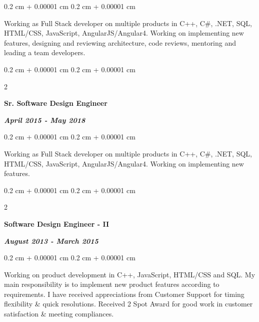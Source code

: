 \documentclass[10pt, letterpaper]{article}
\newenvironment{highlights}{
    \begin{itemize}[
        topsep=0.10 cm,
        parsep=0.10 cm,
        partopsep=0pt,
        itemsep=0pt,
        leftmargin=0.4 cm + 10pt
    ]
}{
    \end{itemize}
} %
\newenvironment{onecolentry}{
    \begin{adjustwidth}{
        0.2 cm + 0.00001 cm
    }{
        0.2 cm + 0.00001 cm
    }
}{
    \end{adjustwidth}
} %
\newenvironment{twocolentry}[2][]{
    \onecolentry
    \def\secondColumn{#2}
    \setcolumnwidth{\fill, 6.0 cm}
    \begin{paracol}{2}
}{
    \switchcolumn \raggedleft \secondColumn
    \end{paracol}
    \endonecolentry
} %
\begin{document}
            \vspace{0.10 cm}
            
            \begin{onecolentry}
                \begin{highlights}
                    Working as Full Stack developer on multiple products in C++, C\#, .NET, SQL, HTML/CSS, JavaScript, AngularJS/Angular4. Working on implementing new features, designing and reviewing architecture, code reviews, mentoring and leading a team developers.
                \end{highlights}
            \end{onecolentry}

            \vspace{0.3 cm}

            \begin{twocolentry}{  
                \textit{\textbf{April 2015 - May 2018}}}
                \textbf{Sr. Software Design Engineer}
            \end{twocolentry}

            \vspace{0.10 cm}
            
            \begin{onecolentry}
                \begin{highlights}
                    Working as Full Stack developer on multiple products in C++, C\#, .NET, SQL, HTML/CSS, JavaScript, AngularJS/Angular4. Working on implementing new features.
                \end{highlights}
            \end{onecolentry}

            \vspace{0.3 cm}

            \begin{twocolentry}{  
                \textit{\textbf{August 2013 - March 2015}}}
                \textbf{Software Design Engineer - II}
            \end{twocolentry}

            \vspace{0.10 cm}
            
            \begin{onecolentry}
                \begin{highlights}
                    Working on product development in C++, JavaScript, HTML/CSS and SQL. 
                    My main responsibility is to implement new product features according to requirements.
                    I have received appreciations from Customer Support for timing flexibility \& quick resolutions.
                    Received 2 Spot Award for good work in customer satisfaction \& meeting compliances.
                \end{highlights}
            \end{onecolentry}
\end{document}
